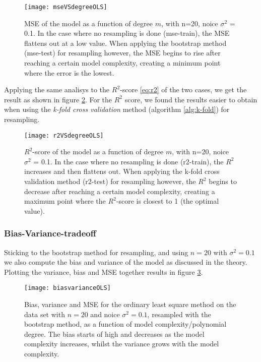 \begin{figure}[htbp]
	\centering
	\texttt{[image: mseVSdegreeOLS]}
	\caption{MSE of the model as a function of degree $m$, with n=20, noice $\sigma^2$ = 0.1. In the case where no resampling is done (mse-train), the MSE flattens out at a low value. When applying the bootstrap method (mse-test) for resampling however, the MSE begins to rise after reaching a certain model complexity, creating a minimum point where the error is the lowest.}
	\label{fig:mseVSdegreeOLS}
\end{figure}

Applying the same analisys to the $R^2$-score \eqref{eq:r2} of the two cases, we get the result as shown in figure \ref{fig:r2VSdegreeOLS}. For the $R^2$ score, we found the results easier to obtain when using the \emph{k-fold cross validation} method (algorithm \ref{alg:k-fold}) for resampling.
\begin{figure}[htbp]
	\centering
	\texttt{[image: r2VSdegreeOLS]}
	\caption{$R^2$-score of the model as a function of degree $m$, with n=20, noice $\sigma^2$ = 0.1. In the case where no resampling is done (r2-train), the $R^2$ increases and then flattens out. When applying the k-fold cross validation method (r2-test) for resampling however, the $R^2$ begins to decrease after reaching a certain model complexity, creating a maximum point where the $R^2$-score is closest to 1 (the optimal value).}
	\label{fig:r2VSdegreeOLS}
\end{figure}

\subsubsection{Bias-Variance-tradeoff}
Sticking to the bootstrap method for resampling, and using $n=20$ with $\sigma^2 = 0.1$ we also compute the bias and variance of the model as discussed in the theory. Plotting the variance, bias and MSE together results in figure \ref{fig:biasvarianceOLS}.

\begin{figure}[htbp]
	\centering
	\texttt{[image: biasvarianceOLS]}
	\caption{Bias, variance and MSE for the ordinary least square method on the data set with $n=20$ and noice $\sigma^2=0.1$, resampled with the bootstrap method, as a function of model complexity/polynomial degree. The bias starts of high and decreases as the model complexity increases, whilst the variance grows with the model complexity.}
	\label{fig:biasvarianceOLS}
\end{figure}

